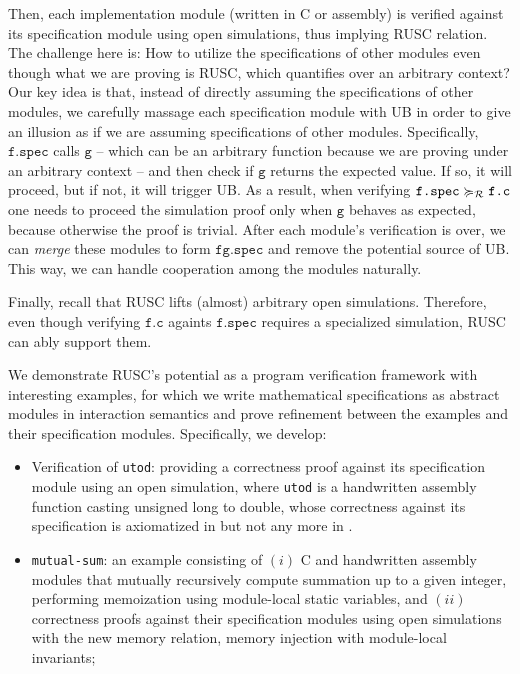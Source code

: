 Then, each implementation module (written in C or assembly) is verified against its specification module using open simulations, thus implying RUSC relation.
The challenge here is: How to utilize the specifications of other modules even though what we are proving is RUSC, which quantifies over an arbitrary context?
Our key idea is that, instead of directly assuming the specifications of other modules, we carefully massage each specification module with UB in order to give an illusion as if we are assuming specifications of other modules.
Specifically, $\texttt{f.spec}$ calls $\texttt{g}$ -- which can be an arbitrary function because we are proving under an arbitrary context -- and then check if $\texttt{g}$ returns the expected value. If so, it will proceed, but if not, it will trigger UB.
As a result, when verifying $\texttt{f.spec} \succcurlyeq_{\mathcal{R}} \texttt{f.c}$ one needs to proceed the simulation proof only when $\texttt{g}$ behaves as expected, because otherwise the proof is trivial.
After each module's verification is over, we can {\it merge} these modules to form $\texttt{fg.spec}$ and remove the potential source of UB.
This way, we can handle cooperation among the modules naturally.

Finally, recall that RUSC lifts (almost) arbitrary open simulations.
Therefore, even though verifying $\texttt{f.c}$ againts $\texttt{f.spec}$ requires a specialized simulation, RUSC can ably support them.


We demonstrate RUSC's potential as a program verification framework with interesting
examples, for which we write mathematical specifications as abstract
modules in interaction semantics and prove refinement between the
examples and their specification modules.  Specifically, we develop:
\begin{itemize}
\item Verification of \texttt{utod}: providing a correctness proof
  against its specification module using an open simulation,
  where \texttt{utod} is a handwritten
  assembly function casting unsigned long to double, whose correctness
  against its specification is axiomatized in \cc{} but not any more
  in \ccm{}.
\item \texttt{mutual-sum}: an example consisting of $(i)$ C and
  handwritten assembly modules that mutually recursively compute
  summation up to a given integer, performing memoization using
  module-local static variables, and $(ii)$ correctness proofs
  against their specification modules using open simulations with the
  new memory relation, memory injection with module-local invariants;
\end{itemize}
\medskip

